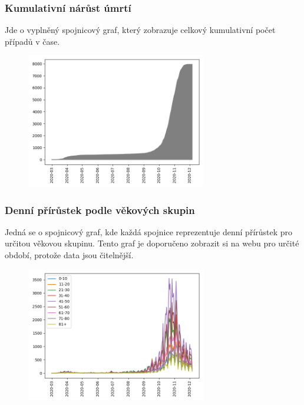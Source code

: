 \documentclass[11pt,a4paper,titlepage]{article}
\begin{document}
\subsubsection{Kumulativní nárůst úmrtí}
Jde o vyplněný spojnicový graf, který zobrazuje celkový kumulativní počet případů v čase.
\begin{figure}[h]
    \centering
    \includegraphics[width=0.70\textwidth]{img/cumulative_deaths.png}
    \label{fig:cumulative_deaths}
\end{figure}

\newpage
\subsubsection{Denní přírůstek podle věkových skupin}
Jedná se o spojnicový graf, kde každá spojnice reprezentuje denní přírůstek pro určitou věkovou skupinu. Tento graf je doporučeno zobrazit si na webu pro určité období, protože data jsou čitelnější.
\begin{figure}[h]
    \centering
    \includegraphics[width=0.70\textwidth]{img/increase_by_age.png}
    \label{fig:daily_by_age}
\end{figure}
\end{document}
